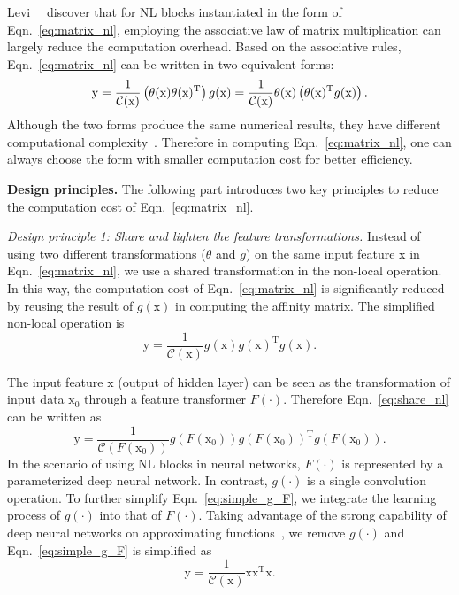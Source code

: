 \documentclass[10pt,twocolumn,letterpaper]{article}
\newcommand{\ma}[1]{\mathrm{#1}} \newcommand{\songbai}[1]{ \textcolor{red}{(song bai: #1)}  }
\begin{document}
Levi~\etal~\cite{levi2018efficient} discover that for NL blocks instantiated in the form of Eqn.~\eqref{eq:matrix_nl}, employing the associative law of matrix multiplication can largely reduce the computation overhead. Based on the associative rules, Eqn.~\eqref{eq:matrix_nl} can be written in two equivalent forms:
\begin{equation} \label{eq:associative_law}\small
    \ma{y}=\frac{1}{\mathcal{C}(\ma{x})} \left(\theta(\ma{x})\theta(\ma{x})^\mathrm{T}\right)g(\ma{x}) = \frac{1}{\mathcal{C}(\ma{x})} \theta(\ma{x})\left(\theta(\ma{x})^\mathrm{T}g(\ma{x})\right).
\end{equation}
Although the two forms produce the same numerical results, they have different computational complexity~\cite{levi2018efficient}. Therefore in computing Eqn.~\eqref{eq:matrix_nl}, one can always choose the form with smaller computation cost for better efficiency. 

\vspace{0.5ex}\noindent\textbf{Design principles.}
The following part introduces two key principles to reduce the computation cost of Eqn.~\eqref{eq:matrix_nl}.

\vspace{0.5ex}\noindent\textit{Design principle 1: Share and lighten the feature transformations.}
Instead of using two different transformations ($\theta$ and $g$) on the same input feature x in Eqn.~\eqref{eq:matrix_nl}, we use a shared transformation in the non-local operation. In this way, the computation cost of Eqn.~\eqref{eq:matrix_nl} is significantly reduced by reusing the result of $g(\ma{x})$ in computing the affinity matrix. The simplified non-local operation is 
\begin{equation} \label{eq:share_nl}
    \ma{y}=\frac{1}{\mathcal{C}(\ma{x})}g(\ma{x})g(\ma{x})^\mathrm{T}g(\ma{x}).
\end{equation}

The input feature $\ma{x}$ (output of hidden layer) can be seen as the transformation of input data $\ma{x_0}$ through a feature transformer $F(\cdot)$. Therefore Eqn.~\eqref{eq:share_nl} can be written as
\begin{equation}\label{eq:simple_g_F}
    \ma{y}=\frac{1}{\mathcal{C}(F(\ma{x_0}))}g(F(\ma{x_0}))g(F(\ma{x_0}))^\mathrm{T}g(F(\ma{x_0})).
\end{equation}
In the scenario of using NL blocks in neural networks, $F(\cdot)$ is represented by a parameterized deep neural network. In contrast, $g(\cdot)$ is a single convolution operation. To further simplify Eqn.~\eqref{eq:simple_g_F}, we integrate the learning process of $g(\cdot)$ into that of $F(\cdot)$. Taking advantage of the strong capability of deep neural networks on approximating functions~\cite{hornik1989multilayer}, we remove $g(\cdot)$ and Eqn.~\eqref{eq:simple_g_F} is simplified as
\begin{equation} \label{eq:remove_nl}
    \ma{y}=\frac{1}{\mathcal{C}(\ma{x})}\ma{x}\ma{x}^\mathrm{T}\ma{x}.
\end{equation}
\end{document}
